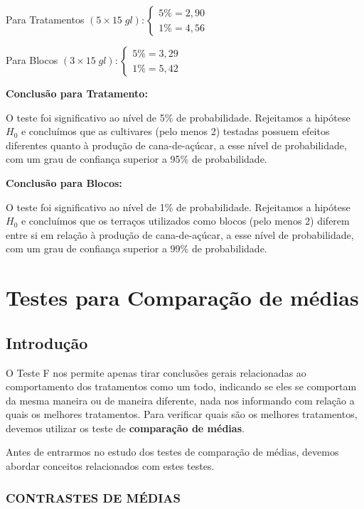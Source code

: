 \documentclass[
]{book}
\begin{document}
Para Tratamentos \((5 \times 15\; gl): \begin{cases} 5\%=2,90 \\ 1\% = 4,56\end{cases}\)

Para Blocos \((3 \times 15\; gl): \begin{cases} 5\%=3,29 \\ 1\% = 5,42\end{cases}\)

\textbf{Conclusão para Tratamento:}

O teste foi significativo ao nível de 5\% de probabilidade. Rejeitamos a hipótese \(H_{0}\) e concluímos que as cultivares (pelo menos 2) testadas possuem efeitos diferentes quanto à produção de cana-de-açúcar, a esse nível de probabilidade, com um grau de confiança superior a 95\% de probabilidade.

\textbf{Conclusão para Blocos:}

O teste foi significativo ao nível de 1\% de probabilidade. Rejeitamos a hipótese \(H_{0}\) e concluímos que os terraços utilizados como blocos (pelo menos 2) diferem entre si em relação à produção de cana-de-açúcar, a esse nível de probabilidade, com um grau de confiança superior a 99\% de probabilidade.

\hypertarget{testes-para-comparauxe7uxe3o-de-muxe9dias}{%
\chapter{Testes para Comparação de médias}\label{testes-para-comparauxe7uxe3o-de-muxe9dias}}

\hypertarget{introduuxe7uxe3o}{%
\section{Introdução}\label{introduuxe7uxe3o}}

O Teste F nos permite apenas tirar conclusões gerais relacionadas ao comportamento dos tratamentos como um todo, indicando se eles se comportam da mesma maneira ou de maneira diferente, nada nos informando com relação a quais os melhores tratamentos. Para verificar quais são os melhores tratamentos, devemos utilizar os teste de \textbf{comparação de médias}.

Antes de entrarmos no estudo dos testes de comparação de médias, devemos abordar conceitos relacionados com estes testes.

\hypertarget{contrastes-de-muxe9dias}{%
\subsection{CONTRASTES DE MÉDIAS}\label{contrastes-de-muxe9dias}}
\end{document}
